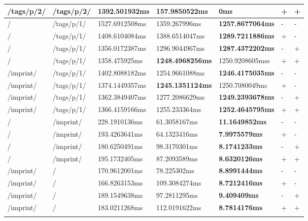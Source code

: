 \begin{appendix}
\begin{center}
\begin{longtable}{lllllll}
	/tags/p/2/ & /tags/p/2/ & 1392.501932ms & 157.9850522ms & \textbf{0ms} & + & + \\
	\hline
	\hline
	/ & /tags/p/1/ & 1527.6912508ms & 1359.267996ms & \textbf{1257.8677064ms} & - & - \\
	/ & /tags/p/1/ & 1408.6104084ms & 1388.6514047ms & \textbf{1289.7211886ms} & + & - \\
	/ & /tags/p/1/ & 1356.0172387ms & 1296.9044967ms & \textbf{1287.4372202ms} & - & + \\
	/ & /tags/p/1/ & 1358.475925ms & \textbf{1248.4968256ms} & 1250.9208605mss & + & + \\
	\hline
	/imprint/ & /tags/p/1/ & 1402.8088182ms & 1254.9661088ms & \textbf{1246.4175035ms} & - & - \\
	/imprint/ & /tags/p/1/ & 1374.1449357ms & \textbf{1245.1351124ms} & 1250.7080049ms & + & - \\
	/imprint/ & /tags/p/1/ & 1362.3849407ms & 1277.2086629ms & \textbf{1249.2393678ms} & - & + \\
	/imprint/ & /tags/p/1/ & 1366.4159166ms & 1255.233364ms & \textbf{1252.4645795ms} & + & + \\
	\hline
	\hline
	/ & /imprint/ & 228.1910136ms & 61.3058167ms & \textbf{11.1649852ms} & - & - \\
	/ & /imprint/ & 193.4263641ms & 64.1323416ms & \textbf{7.9975579ms} & + & - \\
	/ & /imprint/ & 180.6250491ms & 98.3170301ms & \textbf{8.1741233ms} & - & + \\
	/ & /imprint/ & 195.1732405ms & 87.2093589ms & \textbf{8.6320126ms} & + & + \\
	\hline
	/imprint/ & / & 170.9612001ms & 78.225302ms & \textbf{8.8991444ms} & - & - \\
	/imprint/ & / & 166.8263153ms & 109.3084274ms & \textbf{8.7212416ms} & + & - \\
	/imprint/ & / & 189.1549638ms & 97.2811295ms & \textbf{9.409409ms} & - & + \\
	/imprint/ & / & 183.0211268ms & 112.0191622ms & \textbf{8.7814176ms} & + & + \\
	\hline
\label{tab:selenium_benchmark_results_external}
\end{longtable}
\end{center}
\end{appendix}